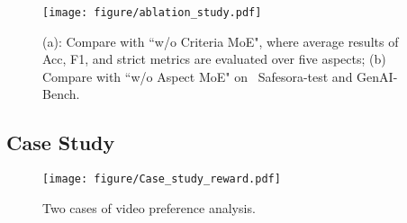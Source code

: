 

\begin{figure}[!hb]
    \centering
    \texttt{[image: figure/ablation\_study.pdf]}
    \vspace{-1.5em}
        \caption{(a): Compare \algname with ``w/o Criteria MoE", where average results of Acc, F1, and strict metrics are evaluated over five aspects; (b) Compare \algname with ``w/o Aspect MoE" on \datasetname\, Safesora-test and GenAI-Bench.}
    \vspace{-1em}
    \label{fig:Abliation_Study}
\end{figure}






\subsection{Case Study}

\begin{figure*}[t]
    \centering
    \texttt{[image: figure/Case\_study\_reward.pdf]}
    \caption{Two cases of video preference analysis.} 
    \label{fig:Case_study}
    \vspace{-1em}
\end{figure*}




